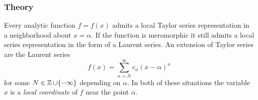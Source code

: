 \subsubsection*{Theory}

Every analytic function $f = f(x)$ admits a local Taylor series
representation in a neighborhood about $x = \alpha$. If the function is
meromorphic it still admits a local series representation in the form of
a Laurent series. An extension of Taylor series are the Laurent series
\[
    f(x) = \sum_{n=N}^\infty c_n (x-\alpha)^n
\]
for some $N \in \operatorname{\mathbb{Z}} \cup \{-\infty\}$ depending on $\alpha$. In both of
these situations the variable $x$ is a {\it local coordinate} of $f$
near the point $\alpha$.

